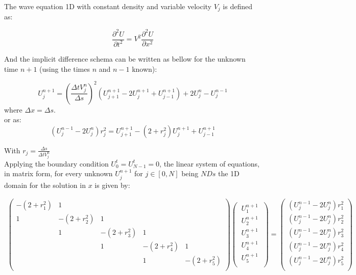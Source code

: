 \documentclass[legalpaper, 12pt]{book}
\begin{document}
The wave equation 1D with constant density  and variable velocity $ V_j$ is defined as:

\begin{equation}
\frac{\partial^2 U}{\partial t ^2} = V^2 \frac{\partial^2 U}{\partial x ^2}
\label{1}
\end{equation}

And the implicit difference schema can be written as bellow for the unknown time $n+1$ (using the times $n$ and $n-1$ known):

\begin{equation}
U_j^{n+1}  =  \left(\frac{\Delta t  V_j^n}{\Delta s}\right)^2 \left(  U_{j+1}^{n+1} - 2 U_j^{n+1} + U_{j-1}^{n+1}  \right) + 2 U_j^n - U_j^{n-1}
\label{2} 
\end{equation}
where $\Delta x = \Delta s $. \\
or as:
\begin{equation}
\left(U_j^{n-1} - 2 U_j^n \right) r_j^{2} =   U_{j+1}^{n+1} - (2 + r_j^2) U_j^{n+1} + U_{j-1}^{n+1} 
\end{equation}

With $r_j = \frac{\Delta s}{\Delta t  V_j^n} $ \\

Applying the boundary condition $U_0^t=U_{N-1}^t=0$, the linear system of equations, in matrix form, for every unknown $ U_j^{n+1} $ for $j \in [0, N]$ being $NDs$ the 1D domain for the solution in $x$ is given by:

\begin{eqnarray}
\begin{pmatrix}
-(2+r_1^2)   &      1      &             &            &            \\
      1      & -(2+r_2^2)  &      1      &            &            \\ 
             &      1      & -(2+r_3^2)  &     1      &            \\ 
             &             &      1      & -(2+r_4^2) &    1       \\    
             &             &             &     1      & -(2+r_5^2) \\    
\end{pmatrix} 
\begin{pmatrix}
 \ U_{1}^{n+1} \ \\
 \ U_{2}^{n+1} \ \\ 
 \ U_{3}^{n+1} \ \\ 
 \ U_{4}^{n+1} \ \\ 
 \ U_{5}^{n+1} \ \\ 
\end{pmatrix}
=
\begin{pmatrix}
\left(U_j^{n-1} - 2 U_j^n \right) r_1^{2} \\
\left(U_j^{n-1} - 2 U_j^n \right) r_2^{2} \\ 
\left(U_j^{n-1} - 2 U_j^n \right) r_3^{2} \\ 
\left(U_j^{n-1} - 2 U_j^n \right) r_4^{2} \\ 
\left(U_j^{n-1} - 2 U_j^n \right) r_5^{2} \\ 
\end{pmatrix}
\end{eqnarray}
\end{document}
